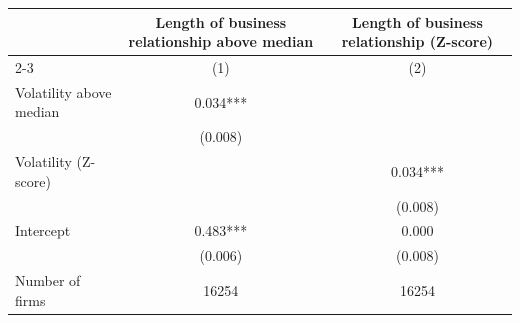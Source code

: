 \begin{tabular}[t]{lcc}
\toprule
  & Length of business relationship above median & Length of business relationship (Z-score) \\
  \cmidrule(lr){2-3} 
  & (1) & (2) \\
\midrule
Volatility above median & 0.034*** & \\
 & (0.008) & \\
Volatility (Z-score) &  & 0.034***\\
 &  & (0.008)\\
Intercept & 0.483*** & 0.000\\
 & (0.006) & (0.008)\\
\midrule
Number of firms & 16254 & 16254\\
\bottomrule
\end{tabular}
